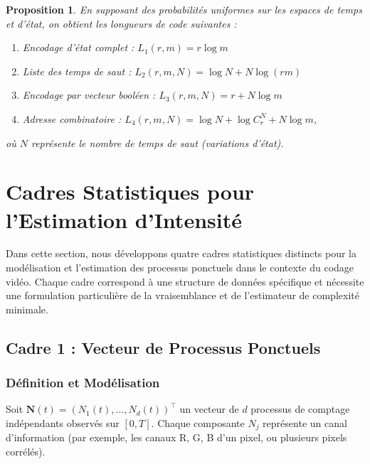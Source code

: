 \documentclass[11pt,a4paper]{article}
\newtheorem{prop}{Proposition}[section]
\begin{document}
	\begin{prop}
		\label{prop:longueurs_code_uniformes}
		En supposant des probabilités uniformes sur les espaces de temps et d'état, on obtient les longueurs de code suivantes :
		\begin{enumerate}
			\item Encodage d'état complet : $L_1(r,m) = r \log m$
			\item Liste des temps de saut : $L_2(r,m,N) = \log N + N \log(rm)$
			\item Encodage par vecteur booléen : $L_3(r,m,N) = r + N \log m$
			\item Adresse combinatoire : $L_4(r,m,N) = \log N + \log C_r^N + N \log m$,
		\end{enumerate}
		où $N$ représente le nombre de temps de saut (variations d'état).
	\end{prop}
	
	\section{Cadres Statistiques pour l'Estimation d'Intensité}
	\label{sec:cadres_statistiques}
	
	Dans cette section, nous développons quatre cadres statistiques distincts pour la modélisation et l'estimation des processus ponctuels dans le contexte du codage vidéo. Chaque cadre correspond à une structure de données spécifique et nécessite une formulation particulière de la vraisemblance et de l'estimateur de complexité minimale.
	
	\subsection{Cadre 1 : Vecteur de Processus Ponctuels}
	\label{subsec:cadre_vecteur}
	
	\subsubsection{Définition et Modélisation}
	
	Soit $\mathbf{N}(t) = (N_1(t), \dots, N_d(t))^\top$ un vecteur de $d$ processus de comptage indépendants observés sur $[0,T]$. Chaque composante $N_j$ représente un canal d'information (par exemple, les canaux R, G, B d'un pixel, ou plusieurs pixels corrélés).
	
\end{document}
